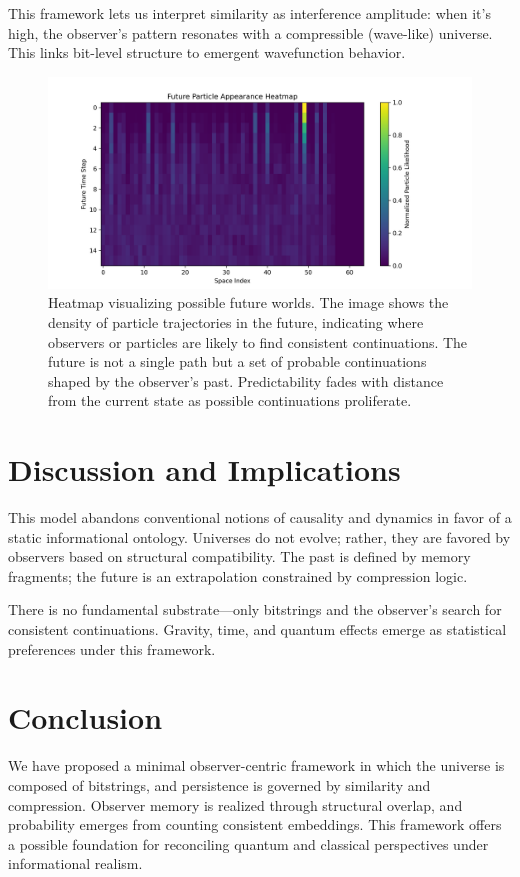 \documentclass[12pt]{article}
\begin{document}
This framework lets us interpret similarity as interference amplitude: when it's high, the observer's pattern resonates with a compressible (wave-like) universe. This links bit-level structure to emergent wavefunction behavior.

\begin{figure}[h!]
    \centering
    \includegraphics[width=1.0\textwidth]{figures/future_particle_heatmap.png}
    \caption{Heatmap visualizing possible future worlds. The image shows the density of particle trajectories in the future, indicating where observers or particles are likely to find consistent continuations. The future is not a single path but a set of probable continuations shaped by the observer's past. Predictability fades with distance from the current state as possible continuations proliferate.}
    \label{fig:future_particle_heatmap}
\end{figure}

\section{Discussion and Implications}

This model abandons conventional notions of causality and dynamics in favor of a static informational ontology. Universes do not evolve; rather, they are favored by observers based on structural compatibility. The past is defined by memory fragments; the future is an extrapolation constrained by compression logic.

There is no fundamental substrate—only bitstrings and the observer's search for consistent continuations. Gravity, time, and quantum effects emerge as statistical preferences under this framework.

\section{Conclusion}

We have proposed a minimal observer-centric framework in which the universe is composed of bitstrings, and persistence is governed by similarity and compression. Observer memory is realized through structural overlap, and probability emerges from counting consistent embeddings. This framework offers a possible foundation for reconciling quantum and classical perspectives under informational realism.
\end{document}
